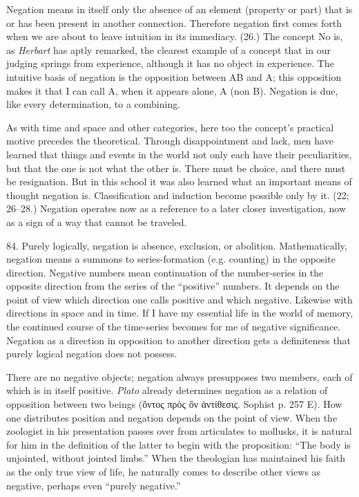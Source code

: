 \documentclass[12pt,a4paper]{book}
\newcommand{\opage}[1]{\marginnote{\footnotesize\textit{[#1]}}}
\begin{document}
Negation means in itself only the absence of an element (property or part)
that is or has been present in another connection. Therefore negation first
comes forth when we are about to leave intuition in its immediacy. (26.) The
concept No is, as \emph{Herbart} has aptly remarked, the clearest example of
a concept that in our judging springs from experience, although it has no
object in experience. The intuitive basis of negation is the opposition
between AB and A; this opposition makes it that I can call A, when it appears
alone, A (non B). Negation is due, like every determination, to a combining.

As with time and space and other categories, here too the concept's
practical motive precedes the theoretical. Through disappointment and lack,
men have learned that things and events in the world not only each have their
peculiarities, but that the one is not what the other is. \opage{203}There must be
choice, and there must be resignation. But in this school it was also learned
what an important means of thought negation is. Classification and induction
become possible only by it. (22; 26--28.) Negation operates now as a
reference to a later closer investigation, now as a sign of a way that cannot
be traveled.

84. Purely logically, negation is absence, exclusion, or abolition.
Mathematically, negation means a summons to series-formation (e.g. counting)
in the opposite direction. Negative numbers mean continuation of the
number-series in the opposite direction from the series of the ``positive''
numbers. It depends on the point of view which direction one calls positive
and which negative. Likewise with directions in space and in time. If I have
my essential life in the world of memory, the continued course of the
time-series becomes for me of negative significance. Negation as a direction
in opposition to another direction gets a definiteness that purely logical
negation does not possess.

There are no negative objects; negation always presupposes two members, each
of which is in itself positive. \emph{Plato} already determines negation as a
relation of opposition between two beings (ὄντος πρὸς ὂν ἀντίθεσις. Sophist
p. 257 E). How one distributes position and negation depends on the point of
view. When the zoologist in his presentation passes over from articulates to
mollusks, it is natural for him in the definition of the latter to begin with
the proposition: ``The body is unjointed, without jointed limbs.'' When the
theologian has maintained his faith as the only true view of life, he
naturally comes to describe other views as negative, perhaps even ``purely
negative.''
\end{document}
